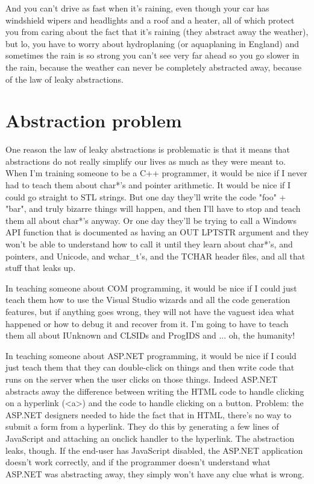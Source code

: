 \documentclass{article}
\begin{document}
\begin{compactitem}
\item And you can't drive as fast when it's raining, even though your car has windshield wipers and headlights and a roof and a heater, all of which protect you from caring about the fact that it's raining (they abstract away the weather), but lo, you have to worry about hydroplaning (or aquaplaning in England) and sometimes the rain is so strong you can't see very far ahead so you go slower in the rain, because the weather can never be completely abstracted away, because of the law of leaky abstractions.
\end{compactitem}

\newpage
\section{Abstraction problem}

One reason the law of leaky abstractions is problematic is that it means that abstractions do not really simplify our lives as much as they were meant to. When I'm training someone to be a C++ programmer, it would be nice if I never had to teach them about char*'s and pointer arithmetic. It would be nice if I could go straight to STL strings. But one day they'll write the code "foo" + "bar", and truly bizarre things will happen, and then I'll have to stop and teach them all about char*'s anyway. Or one day they'll be trying to call a Windows API function that is documented as having an OUT LPTSTR argument and they won't be able to understand how to call it until they learn about char*'s, and pointers, and Unicode, and wchar\_t's, and the TCHAR header files, and all that stuff that leaks up.

In teaching someone about COM programming, it would be nice if I could just teach them how to use the Visual Studio wizards and all the code generation features, but if anything goes wrong, they will not have the vaguest idea what happened or how to debug it and recover from it. I'm going to have to teach them all about IUnknown and CLSIDs and ProgIDS and ... oh, the humanity!

In teaching someone about ASP.NET programming, it would be nice if I could just teach them that they can double-click on things and then write code that runs on the server when the user clicks on those things. Indeed ASP.NET abstracts away the difference between writing the HTML code to handle clicking on a hyperlink (<a>) and the code to handle clicking on a button. Problem: the ASP.NET designers needed to hide the fact that in HTML, there's no way to submit a form from a hyperlink. They do this by generating a few lines of JavaScript and attaching an onclick handler to the hyperlink. The abstraction leaks, though. If the end-user has JavaScript disabled, the ASP.NET application doesn't work correctly, and if the programmer doesn't understand what ASP.NET was abstracting away, they simply won't have any clue what is wrong.
\end{document}
